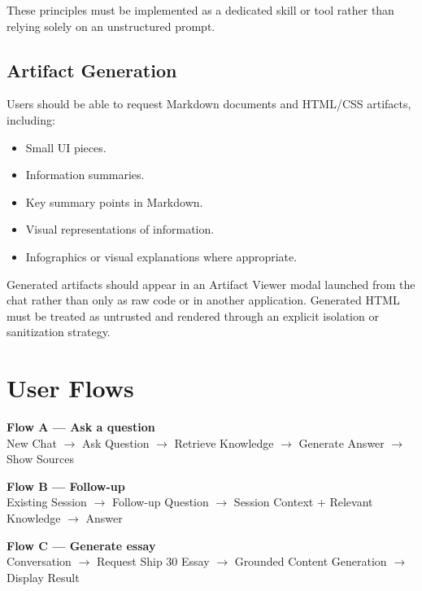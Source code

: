 \documentclass[11pt]{article}
\newcommand{\flowarrow}{\textcolor{Brand}{\ensuremath{\rightarrow}}}
\begin{document}
These principles must be implemented as a dedicated skill or tool rather than relying solely on an unstructured prompt.

\subsection{Artifact Generation}
Users should be able to request Markdown documents and HTML/CSS artifacts, including:
\begin{itemize}
  \item Small UI pieces.
  \item Information summaries.
  \item Key summary points in Markdown.
  \item Visual representations of information.
  \item Infographics or visual explanations where appropriate.
\end{itemize}

Generated artifacts should appear in an Artifact Viewer modal launched from the chat rather than only as raw code or in another application. Generated HTML must be treated as untrusted and rendered through an explicit isolation or sanitization strategy.

\section{User Flows}

\begin{tcolorbox}[colback=SlatePale,colframe=Rule,boxrule=.6pt,arc=2mm]
\textbf{Flow A — Ask a question}\\[0.2em]
New Chat \flowarrow{} Ask Question \flowarrow{} Retrieve Knowledge \flowarrow{} Generate Answer \flowarrow{} Show Sources
\end{tcolorbox}

\begin{tcolorbox}[colback=SlatePale,colframe=Rule,boxrule=.6pt,arc=2mm]
\textbf{Flow B — Follow-up}\\[0.2em]
Existing Session \flowarrow{} Follow-up Question \flowarrow{} Session Context + Relevant Knowledge \flowarrow{} Answer
\end{tcolorbox}

\begin{tcolorbox}[colback=SlatePale,colframe=Rule,boxrule=.6pt,arc=2mm]
\textbf{Flow C — Generate essay}\\[0.2em]
Conversation \flowarrow{} Request Ship 30 Essay \flowarrow{} Grounded Content Generation \flowarrow{} Display Result
\end{tcolorbox}
\end{document}
